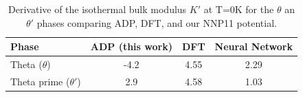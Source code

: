 \documentclass{article}
\begin{document}



\begin{table}[H]
    \caption{Derivative of the isothermal bulk modulus $K'$ at T=0K  for the $\theta$ an $\theta'$ phases comparing ADP, DFT, and our NNP11 potential.}
\begin{tabular}{lccc}
\hline
\hline
Phase        & ADP (this work)          & DFT        & Neural Network \\ 
\hline 
Theta ($\theta$)        & -4.2      & 4.55     & 2.29  \\
Theta prime ($\theta'$)        & 2.9    & 4.58 & 1.03 \\      
\hline
\hline
\end{tabular}
\label{albert_tab1}
\end{table}
\end{document}
